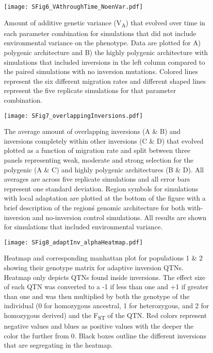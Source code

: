 \documentclass[10pt, scrartlc]{article}
\begin{document}
\clearpage
\newpage

\begin{figure}[h]
	\begin{center}
		\texttt{[image: SFig6\_VAthroughTime\_NoenVar.pdf]}
	\end{center}
	\caption[Supplementary Figure 6: Additive Genetic Variance (no environmental variance)]{Amount of additive genetic variance (V\textsubscript{A}) that evolved over time in each parameter combination for simulations that did not include environmental variance on the phenotype. Data are plotted for A) polygenic architecture and B) the highly polygenic architecture with simulations that included inversions in the left column compared to the paired simulations with no inversion mutations. Colored lines represent the six different migration rates and different shaped lines represent the five replicate simulations for that parameter combination. }
\end{figure}

\clearpage
\newpage

\begin{figure}[h]
	\begin{center}
		\texttt{[image: SFig7\_overlappingInversions.pdf]}
	\end{center}
	\caption[Supplementary Figure 7: Overlapping Inversions]{The average amount of overlapping inversions (A \& B) and inversions completely within other inversions (C \& D) that evolved plotted as a function of migration rate and split between three panels representing weak, moderate and strong selection for the polygenic (A \& C) and highly polygenic architectures (B \& D). All averages are across five replicate simulations and all error bars represent one standard deviation. Region symbols for simulations with local adaptation are plotted at the bottom of the figure with a brief description of the region\'s genomic architecture for both with-inversion and no-inversion control simulations. All results are shown for simulations that included environmental variance.}
\end{figure}

\begin{figure}[h]
	\begin{center}
		\texttt{[image: SFig8\_adaptInv\_alphaHeatmap.pdf]}
	\end{center}
	\caption[Supplementary Figure 8: Heatmap for adaptive inversion QTN effect sizes]{Heatmap and corresponding manhattan plot for populations 1 \& 2 showing their genotype matrix for adaptive inversion QTNs. Heatmap only depicts QTNs found inside inversions. The effect size of each QTN was converted to a -1 if less than one and +1 if greater than one and was then multiplied by both the genotype of the individual (0 for homozygous ancestral, 1 for heterozygous, and 2 for homozygous derived) and the F\textsubscript{ST} of the QTN. Red colors represent negative values and blues as positive values with the deeper the color the further from 0. Black boxes outline the different inversions that are segregating in the heatmap.}
\end{figure}
\end{document}
